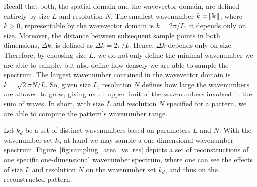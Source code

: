 Recall that both, the spatial domain and the wavevector domain, are defined
entirely by size $L$ and resolution $N$. The smallest wavenumber
$k = \norm{\mathbf{k}}$, where $k > 0$, representable by the wavevector domain is
$k = 2\pi/L$, it depends only on size. Moreover, the distance between subsequent
sample points in both dimensions, $\Delta k$, is defined as $\Delta k = 2\pi/L$.
Hence, $\Delta k$ depends only on size. Therefore, by choosing size $L$, we do
not only define the minimal wavenumber we are able to sample, but also define
how densely we are able to sample the spectrum. The largest wavenumber contained
in the wavevector domain is $k = \sqrt{2}\pi N/L$. So, given size $L$,
resolution $N$ defines how large the wavenumbers are allowed to grow, giving us
an upper limit of the wavenumbers involved in the sum of waves. In short, with
size $L$ and resolution $N$ specified for a pattern, we are able to compute the
pattern's wavenumber range.

Let $k_d$ be a set of distinct wavenumbers based on parameters $L$ and $N$. With
the wavenumber set $k_d$ at hand we may sample a one-dimensional wavenumber
spectrum. Figure~\ref{fig:sampling_area_vs_res} depicts a set of reconstructions
of one specific one-dimensional wavenumber spectrum, where one can see the
effects of size $L$ and resolution $N$ on the wavenumber set $k_d$, and thus on
the reconstructed pattern.


